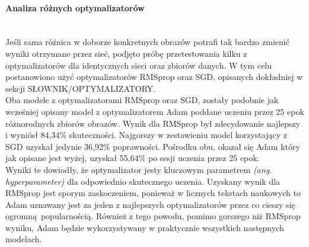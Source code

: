 \paragraph{Analiza różnych optymalizatorów} \mbox{}\\
Jeśli sama różnica w doborze konkretnych obrazów potrafi tak bardzo zmienić wyniki
otrzymane przez sieć, podjęto próbę przetestowania kilku z optymalizatorów dla
identycznych sieci oraz zbiorów danych. W tym celu postanowiono użyć optymalizatorów
RMSprop oraz SGD, opisanych dokładniej w sekcji SŁOWNIK/OPTYMALIZATORY.\\
Oba modele z optymalizatorami RMSprop oraz SGD, zostały podobnie jak wcześniej opisany
model z optymalizatorem Adam poddane uczeniu przez 25 epok różnorodnych zbiorów obrazów.
Wynik dla RMSprop był zdecydowanie najlepszy i wyniósł 84,34\% skuteczności.
Najgorszy w zestawieniu model korzystający z SGD uzyskał jedynie 36,92\% poprawności.
Pośrodku obu, okazał się Adam który jak opisane jest wyżej, uzyskał 55,64\% po sesji
uczenia przez 25 epok.\\
Wyniki te dowiodły, że optymalizator jesty kluczowym parametrem \textit{(ang. hyperparameter)}
dla odpowiednio skutecznego uczenia. Uzyskany wynik dla RMSprop jest sporym zaskoczeniem,
ponieważ w licznych tekstach naukowych to Adam uznawany jest za jeden z najlepszych
optymalizatorów przez co cieszy się ogromną popularnością. Również z tego powodu, pomimo
gorszego niż RMSprop wyniku, Adam będzie wykorzystywany w praktycznie wszystkich następnych
modelach.

